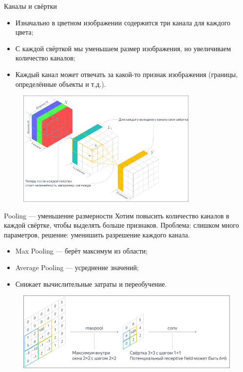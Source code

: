 \documentclass[notheorems, handout]{beamer}
\begin{document}
\begin{frame}{Каналы и свёртки}
    \begin{itemize}
        \item Изначально в цветном изображении содержится три канала для каждого цвета;
        \item С каждой свёрткой мы уменьшаем размер изображения, но увеличиваем количество каналов;
        \item Каждый канал может отвечать за какой-то признак изображения (границы, определённые объекты и т.д.).
    \end{itemize}
    \begin{figure}
        \includegraphics[width=0.8\textwidth]{img/canals.png}
    \end{figure}
\end{frame}

\begin{frame}{Pooling — уменьшение размерности}
    Хотим повысить количество каналов в каждой свёртке, чтобы выделять больше признаков. Проблема: слишком много параметров, решение: уменишить разрешение каждого канала.

    \begin{itemize}
        \item Max Pooling — берёт максимум из области;
        \item Average Pooling — усреднение значений;
        \item Снижает вычислительные затраты и переобучение.
    \end{itemize}
    \begin{figure}
        \includegraphics[width=\linewidth]{img/max_pooling.png}        
    \end{figure}
\end{frame}
\end{document}
